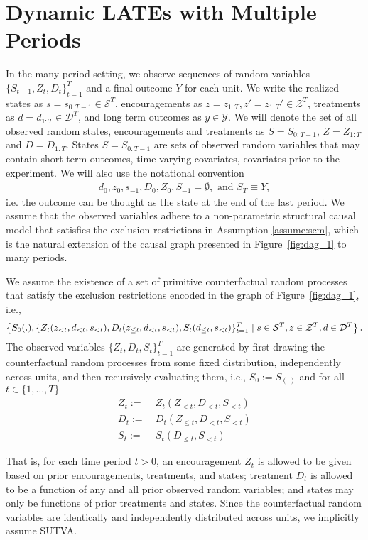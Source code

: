 \section{Dynamic LATEs with Multiple Periods}

In the many period setting, we observe sequences of random variables $\{S_{t-1}, Z_t, D_t\}_{t=1}^T$ and a final outcome $Y$ for each unit. We write the realized states as $s=s_{0:T-1} \in \mathcal{S}^T$, encouragements as $z=z_{1:T}, z'=z_{1:T}' \in \mathcal{Z}^T$, treatments as $d=d_{1:T} \in \mathcal{D}^T$, and long term outcomes as $y \in \mathcal{Y}$. We will denote the set of all observed random states, encouragements and treatments as $S=S_{0:T-1}$, $Z=Z_{1:T}$ and $D=D_{1:T}$.
States $S = S_{0:T-1}$ are sets of observed random variables that may contain short term outcomes, time varying covariates, covariates prior to the experiment. We will also use the notational convention 
\begin{align*}
d_{0}, z_{0}, s_{-1}, D_{0}, Z_{0}, S_{-1}=\emptyset, \text{ and } S_{T}\equiv Y,
\end{align*}
i.e. the outcome can be thought as the state at the end of the last period. We assume that the observed variables adhere to a non-parametric structural causal model that satisfies the exclusion restrictions in Assumption \ref{assume:scm}, which is the natural extension of the causal graph presented in Figure~\ref{fig:dag_1} to many periods.

\begin{assumption}\label{assume:scm_many} We assume the existence of a set of primitive counterfactual random processes that satisfy the exclusion restrictions encoded in the graph of Figure~\ref{fig:dag_1}, i.e.,
\begin{align}\label{eqn:counterfactuals_many}
\left\{S_0(.), \{Z_t(z_{<t}, d_{<t}, s_{<t}), D_t(z_{\leq t}, d_{<t}, s_{<t}), S_{t}(d_{\leq t}, s_{<t})\}_{t=1}^T\mid s\in {\cal S}^T, z\in {\cal Z}^T, d\in {\cal D}^T\right\}.
\end{align}
The observed variables $\{Z_t, D_t, S_{t}\}_{t=1}^T$ are generated by first drawing the counterfactual random processes from some fixed distribution, independently across units, and then recursively evaluating them, i.e., $S_0 := S_(.)$ and for all $t\in \{1,\ldots, T\}$
\begin{align*}
Z_{t} :=~& Z_{t}(Z_{<t}, D_{<t}, S_{<t})\\
D_{t} :=~& D_{t}(Z_{\leq t}, D_{<t}, S_{<t})\\
S_{t} :=~& S_{t}(D_{\leq t}, S_{<t})
\end{align*}
\end{assumption}
\noindent
That is, for each time period $t > 0$, an encouragement $Z_t$ is allowed to be given based on prior encouragements, treatments, and states; treatment $D_t$ is allowed to be a function of any and all prior observed random variables; and states may only be functions of prior treatments and states. Since the counterfactual random variables are identically and independently distributed across units, we implicitly assume SUTVA.

